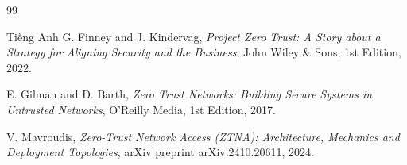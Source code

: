 \documentclass{uetgraduation}
\begin{document}
\begin{thebibliography}{99}
\begin{bibsection}{Tiếng Anh}
        G. Finney and J. Kindervag,
        \textit{Project Zero Trust: A Story about a Strategy for Aligning Security and the Business},
        John Wiley \& Sons, 1st Edition, 2022.

        E. Gilman and D. Barth,
        \textit{Zero Trust Networks: Building Secure Systems in Untrusted Networks},
        O'Reilly Media, 1st Edition, 2017.

        V. Mavroudis,
        \textit{Zero-Trust Network Access (ZTNA): Architecture, Mechanics and Deployment Topologies},
        arXiv preprint arXiv:2410.20611, 2024.
    \end{bibsection}
\end{thebibliography}
\end{document}
